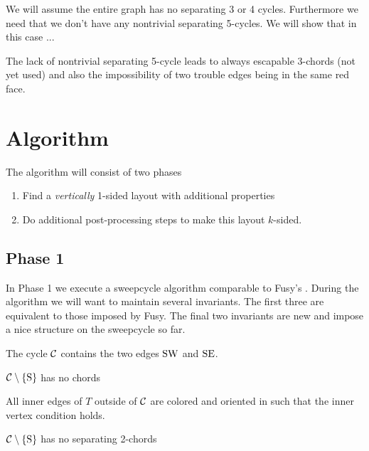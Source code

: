 \renewcommand{\Q}{\scr Q}



We will assume the entire graph has no separating 3 or 4 cycles. Furthermore we need that we don't have any nontrivial separating 5-cycles.  We will show that in this case ...

The lack of nontrivial separating 5-cycle leads to always escapable 3-chords (not yet used) and also the impossibility of two trouble edges being in the same red face.


\section{Algorithm}
  The algorithm will consist of two phases

  \begin{enumerate}
    \item Find a \emph{vertically} 1-sided layout with additional properties
    \item Do additional post-processing steps to make this layout $k$-sided.
  \end{enumerate}

\subsection{Phase 1}
  In Phase 1 we execute a sweepcycle algorithm comparable to Fusy's \cite{Fusy2006}.
  During the algorithm we will want to maintain several invariants. The first three are equivalent to those imposed by Fusy. The final two invariants are new and impose a nice structure on the sweepcycle so far.

  \begin{invariants}
    \itemsep=-4pt

    \item \label{i:uni:SWandSE} The cycle $\mathcal{C}$ contains the two edges $\mathrm{S} \mathrm{W}$ and $\mathrm{S} \mathrm{E}$.
    \item \label{i:uni:noChords} $\mathcal{C} \setminus \left\lbrace {\mathrm{S}} \right\rbrace$ has no chords
    \item \label{i:uni:intVertCond} All inner edges of $T$ outside of $\mathcal{C}$ are colored and oriented in such that the inner vertex condition holds. %
    \item \label{i:uni:no2Chords} $\mathcal{C}\setminus \left\lbrace {\mathrm{S}} \right\rbrace$ has no separating 2-chords
  \end{invariants}


